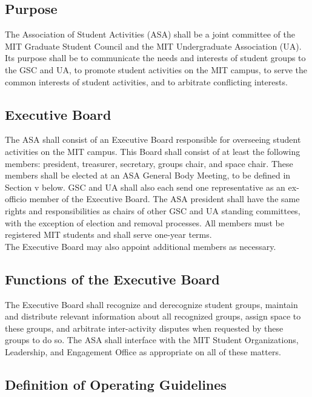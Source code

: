 \documentclass[12pt]{article}
\begin{document}
\subsection{Purpose}
The Association of Student Activities (ASA) shall be a joint committee of the MIT Graduate Student Council and the MIT Undergraduate Association (UA). Its purpose shall be to communicate the needs and interests of student groups to the GSC and UA, to promote student activities on the MIT campus, to serve the common interests of student activities, and to arbitrate conflicting interests.

\subsection{Executive Board}

The ASA shall consist of an Executive Board responsible for overseeing student activities on the MIT campus. This Board shall consist of at least the following members: president, treasurer, secretary, groups chair, and space chair. These members shall be elected at an ASA General Body Meeting, to be defined in Section v below. GSC and UA shall also each send one representative as an ex-officio member of the Executive Board. The ASA president shall have the same rights and responsibilities as chairs of other GSC and UA standing committees, with the exception of election and removal processes. All members must be registered MIT students and shall serve one-year terms.
\\

The Executive Board may also appoint additional members as necessary.

\subsection{Functions of the Executive Board}

The Executive Board shall recognize and derecognize student groups, maintain and distribute relevant information about all recognized groups, assign space to these groups, and arbitrate inter-activity disputes when requested by these groups to do so. The ASA shall interface with the MIT Student Organizations, Leadership, and Engagement Office as appropriate on all of these matters.

\subsection{Definition of Operating Guidelines}
\label{bylaws:5iv}
\end{document}
